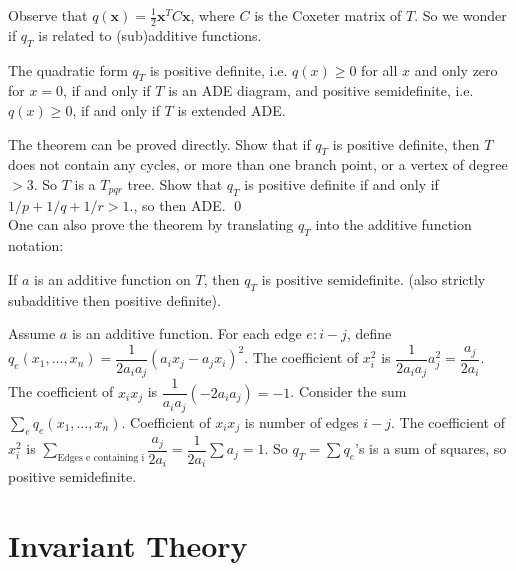 Observe that $q(\mathbf{x})= \frac{1}{2}\mathbf{x}^TC\mathbf{x}$, where $C$ is the Coxeter matrix of $T$. So we wonder if $q_T$ is related to (sub)additive functions. 

\begin{thm}
The quadratic form $q_T$ is positive definite, i.e. $q(x) \geq 0$ for all $x$ and only zero for $x=0$, if and only if $T$ is an ADE diagram, and positive semidefinite, i.e. $q(x) \geq 0$, if and only if $T$ is extended ADE. 
\end{thm}

The theorem can be proved directly. Show that if $q_T$ is positive definite, then $T$ does not contain any cycles, or more than one branch point, or a vertex of degree $>3$. So $T$ is a $T_{pqr}$ tree. Show that $q_T$ is positive definite if and only if $1/p+1/q+1/r>1$., so then ADE. \qed \\




One can also prove the theorem by translating $q_T$ into the additive function notation: 

\begin{prop}
If $a$ is an additive function on $T$, then $q_T$ is positive semidefinite. (also strictly subadditive then positive definite). 
\end{prop}

\pf Assume $a$ is an additive function. For each edge $e:i-j$, define $q_e(x_1,\ldots,x_n)= \dfrac{1}{2a_ia_j} (a_ix_j-a_jx_i)^2$. The coefficient of $x_i^2$ is $\dfrac{1}{2a_ia_j} a_j^2= \dfrac{a_j}{2a_i}$. The coefficient of $x_ix_j$ is $\dfrac{1}{a_ia_j} (-2a_ia_j)= -1$. Consider the sum $\sum_e q_e(x_1,\ldots,x_n)$. Coefficient of $x_ix_j$ is number of edges $i-j$. The coefficient of $x_i^2$ is $\sum_{\text{Edges e containing i}} \dfrac{a_j}{2a_i}= \dfrac{1}{2a_i} \sum a_j=1$. So $q_T= \sum q_e$'s is a sum of squares, so positive semidefinite. 













\section{Invariant Theory}


